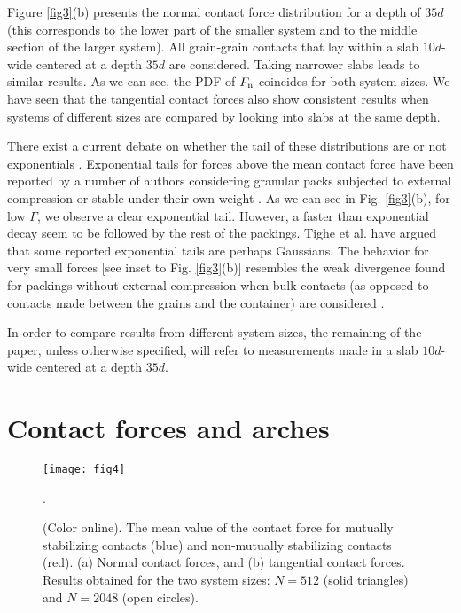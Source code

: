 Figure \ref{fig3}(b) presents the normal contact force distribution for a depth of $35 d$ (this corresponds to the lower part of the smaller system and to the middle section of the larger system). All grain-grain contacts that lay within a slab $10 d$-wide centered at a depth $35 d$ are considered. Taking narrower slabs leads to similar results. As we can see, the PDF of $F_{\rm{n}}$ coincides for both system sizes. We have seen that the tangential contact forces also show consistent results when systems of different sizes are compared by looking into slabs at the same depth. 

There exist a current debate on whether the tail of these distributions are or not exponentials \cite{tighe,eerd}. Exponential tails for forces above the mean contact force have been reported by a number of authors considering granular packs subjected to external compression \cite{behringer,mueth,snoeijer2} or stable under their own weight \cite{lovoll}. As we can see in Fig. \ref{fig3}(b), for low $\Gamma$, we observe a clear exponential tail. However, a faster than exponential decay seem to be followed by the rest of the packings. Tighe et al. \cite{tighe} have argued that some reported exponential tails are perhaps Gaussians. The behavior for very small forces [see inset to Fig. \ref{fig3}(b)] resembles the weak divergence found for packings without external compression when bulk contacts (as opposed to contacts made between the grains and the container) are considered \cite{snoeijer2}.

In order to compare results from different system sizes, the remaining of the paper, unless otherwise specified, will refer to measurements made in a slab $10 d$-wide centered at a depth $35 d$. 


\section{Contact forces and arches}

\begin{figure}[b]
\centering
\texttt{[image: fig4]}
\caption {(Color online). The mean value of the contact force for mutually stabilizing contacts (blue) and non-mutually stabilizing contacts (red). (a) Normal contact forces, and (b) tangential contact forces. Results obtained for the two system sizes: $N=512$ (solid triangles) and $N=2048$ (open circles).}.
\label{fig4}
\end{figure}

